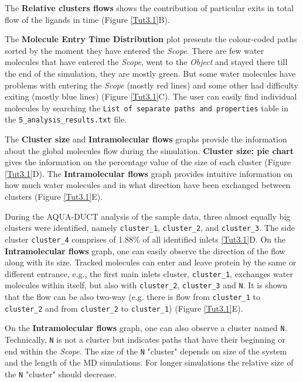 \documentclass[9pt,tutorial, pubversion]{livecoms}
\begin{document}
The \textbf{Relative clusters flows} shows the contribution of particular exits in total flow of the ligands in time ({Figure \ref{Tut3.1}B}).

The \textbf{Molecule Entry Time Distribution} plot presents the colour-coded paths sorted by the moment they have entered the \textit{Scope}. There are few water molecules that have entered the \textit{Scope}, went to the \textit{Object} and stayed there till the end of the simulation, they are mostly green. But some water molecules have problems with entering the \textit{Scope} (mostly red lines) and some other had difficulty exiting (mostly blue lines) (Figure \ref{Tut3.1}C). The user can easily find individual molecules by searching the \texttt{List of separate paths and properties} table in the \texttt{5\_analysis\_results.txt} file.

The \textbf{Cluster size} and \textbf{Intramolecular flows} graphs provide the information about the global molecules flow during the simulation. \textbf{Cluster size: pie chart} gives the information on the percentage value of the size of each cluster (Figure \ref{Tut3.1}D). The \textbf{Intramolecular flows} graph provides intuitive information on how much water molecules and in what direction have been exchanged between clusters (Figure \ref{Tut3.1}E). 

During the AQUA-DUCT analysis of the sample data, three almost equally big clusters were identified, namely \texttt{cluster\_1}, \texttt{cluster\_2}, and \texttt{cluster\_3}. The side cluster \texttt{cluster\_4} comprises of 1.88\% of all identified inlets \ref{Tut3.1}D. On the \textbf{Intramolecular flows} graph, one can easily observe the direction of the flow along with its size. Tracked molecules can enter and leave protein by the same or different entrance, e.g., the first main inlets cluster, \texttt{cluster\_1}, exchanges water molecules within itself, but also with \texttt{cluster\_2}, \texttt{cluster\_3} and \texttt{N}. It is shown that the flow can be also two-way (e.g. there is flow from \texttt{cluster\_1} to \texttt{cluster\_2} and from \texttt{cluster\_2} to \texttt{cluster\_1}) (Figure \ref{Tut3.1}E). 

On the \textbf{Intramolecular flows} graph, one can also observe a cluster named \texttt{N}. Technically, \texttt{N} is not a cluster but indicates paths that have their beginning or end within the \emph{Scope}. The size of the \texttt{N} "cluster" depends on size of the system and the length of the MD simulations. For longer simulations the relative size of the \texttt{N} "cluster" should decrease.
\end{document}
